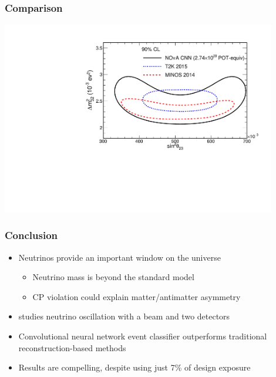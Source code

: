 \documentclass[10pt,professionalfonts,xcolor=table]{beamer}
\begin{document}
\begin{frame}
\frametitle{Comparison}
\centering
\includegraphics[angle=-90, width=0.9\textwidth]{figures/results/fd_extrap_contour_OverlayT2KMINOS.pdf}
\end{frame}



\begin{frame}
\frametitle{Conclusion}
\begin{itemize}
\item Neutrinos provide an important window on the universe
  \begin{itemize}
  \item Neutrino mass is beyond the standard model
  \item CP violation could explain matter/antimatter asymmetry
  \end{itemize}
\gap
\item \nova studies neutrino oscillation with a beam and two detectors
\gap
\item Convolutional neural network event classifier outperforms traditional reconstruction-based methods
\gap
\item Results are compelling, despite using just 7\% of \nova design exposure
\end{itemize}

\end{frame}
\end{document}
